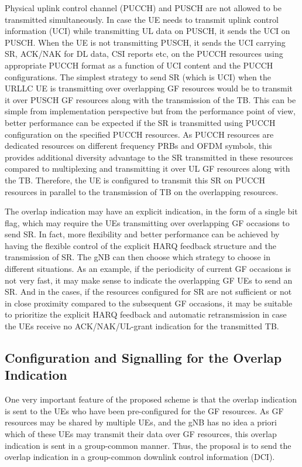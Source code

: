 \documentclass[conference]{IEEEtran}
\begin{document}
Physical uplink control channel (PUCCH) and PUSCH are not allowed to be transmitted simultaneously. In case the UE needs to transmit uplink control information (UCI) while transmitting UL data on PUSCH, it sends the UCI on PUSCH. When the UE is not transmitting PUSCH, it sends the UCI carrying SR, ACK/NAK for DL data, CSI reports etc, on the PUCCH resources using appropriate PUCCH format as a function of UCI content and the PUCCH configurations. The simplest strategy to send SR (which is UCI) when the URLLC UE is transmitting over overlapping GF resources would be to transmit it over PUSCH GF resources along with the transmission of the TB. This can be simple from implementation perspective but from the performance point of view, better performance can be expected if the SR is transmitted using PUCCH configuration on the specified PUCCH resources. As PUCCH resources are dedicated resources on different frequency PRBs and OFDM symbols, this provides additional diversity advantage to the SR transmitted in these resources compared to multiplexing and transmitting it over UL GF resources along with the TB. Therefore, the UE is configured to transmit this SR on PUCCH resources in parallel to the transmission of TB on the overlapping resources.

The overlap indication may have an explicit indication, in the form of a single bit flag, which may require the UEs transmitting over overlapping GF occasions to send SR. In fact, more flexibility and better performance can be achieved by having the flexible control of the explicit HARQ feedback structure and the transmission of SR. The gNB can then choose which strategy to choose in different situations. As an example, if the periodicity of current GF occasions is not very fast, it may make sense to indicate the overlapping GF UEs to send an SR. And in the cases, if the resources configured for SR are not sufficient or not in close proximity compared to the subsequent GF occasions, it may be suitable to prioritize the explicit HARQ feedback and automatic retransmission in case the UEs receive no ACK/NAK/UL-grant indication for the transmitted TB.

\subsection{Configuration and Signalling for the Overlap Indication}\label{IICC}
One very important feature of the proposed scheme is that the overlap indication is sent to the UEs who have been pre-configured for the GF resources. As GF resources may be shared by multiple UEs, and the gNB has no idea a priori which of these UEs may transmit their data over GF resources, this overlap indication is sent in a group-common manner. Thus, the proposal is to send the overlap indication in a group-common downlink control information (DCI).
\end{document}

